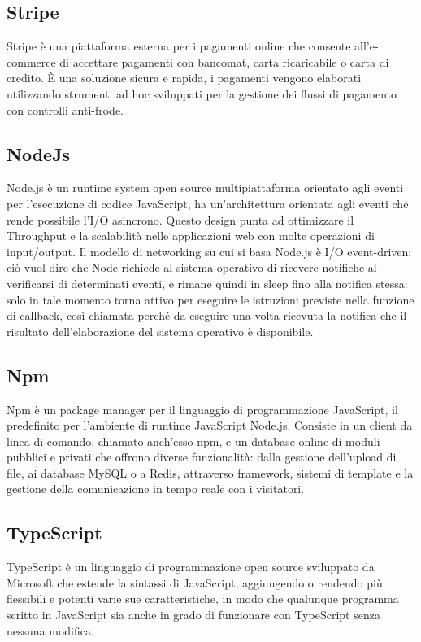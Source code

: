 \subsection{Stripe}
Stripe è una piattaforma esterna per i pagamenti online che consente all'e-commerce di accettare pagamenti con bancomat, carta ricaricabile o carta di credito. È una soluzione sicura e rapida, i pagamenti vengono elaborati utilizzando strumenti ad hoc sviluppati per la gestione dei flussi di pagamento con controlli anti-frode.
\subsection{NodeJs}
Node.js è un runtime system open source multipiattaforma orientato agli eventi per l'esecuzione di codice JavaScript, ha un'architettura orientata agli eventi che rende possibile l’I/O asincrono. Questo design punta ad ottimizzare il Throughput e la scalabilità nelle applicazioni web con molte operazioni di input/output. Il modello di networking su cui si basa Node.js è I/O event-driven: ciò vuol dire che Node richiede al sistema operativo di ricevere notifiche al verificarsi di determinati eventi, e rimane quindi in sleep fino alla notifica stessa: solo in tale momento torna attivo per eseguire le istruzioni previste nella funzione di callback, così chiamata perché da eseguire una volta ricevuta la notifica che il risultato dell'elaborazione del sistema operativo è disponibile.
\subsection{Npm}
Npm è un package manager per il linguaggio di programmazione JavaScript, il predefinito per l'ambiente di runtime JavaScript Node.js. Consiste in un client da linea di comando, chiamato anch'esso npm, e un database online di moduli pubblici e privati che offrono diverse funzionalità: dalla gestione dell’upload di file, ai database MySQL o a Redis, attraverso framework, sistemi di template e la gestione della comunicazione in tempo reale con i visitatori.
\subsection{TypeScript}
TypeScript è un linguaggio di programmazione open source sviluppato da Microsoft che estende la sintassi di JavaScript, aggiungendo o rendendo più flessibili e potenti varie sue caratteristiche, in modo che qualunque programma scritto in JavaScript sia anche in grado di funzionare con TypeScript senza nessuna modifica. 
